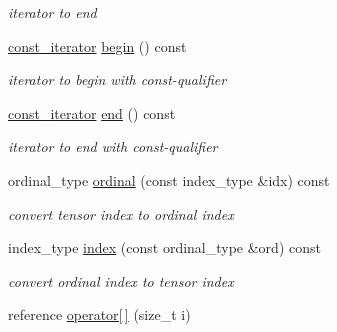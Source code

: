 \begin{DoxyCompactItemize}
\begin{DoxyCompactList}\small\item\em iterator to end \item\end{DoxyCompactList}\item 
\hypertarget{classbtas_1_1_tensor_view_a9e88e693271b40aef94f64db869b6d6e}{
\hyperlink{classbtas_1_1_tensor_iterator}{const\_\-iterator} \hyperlink{classbtas_1_1_tensor_view_a9e88e693271b40aef94f64db869b6d6e}{begin} () const }
\label{classbtas_1_1_tensor_view_a9e88e693271b40aef94f64db869b6d6e}

\begin{DoxyCompactList}\small\item\em iterator to begin with const-\/qualifier \item\end{DoxyCompactList}\item 
\hypertarget{classbtas_1_1_tensor_view_a58c3e09ba30b29b71818cdeef20d78c3}{
\hyperlink{classbtas_1_1_tensor_iterator}{const\_\-iterator} \hyperlink{classbtas_1_1_tensor_view_a58c3e09ba30b29b71818cdeef20d78c3}{end} () const }
\label{classbtas_1_1_tensor_view_a58c3e09ba30b29b71818cdeef20d78c3}

\begin{DoxyCompactList}\small\item\em iterator to end with const-\/qualifier \item\end{DoxyCompactList}\item 
\hypertarget{classbtas_1_1_tensor_view_ac3ceecb8cab4908b986105331eb2b21f}{
ordinal\_\-type \hyperlink{classbtas_1_1_tensor_view_ac3ceecb8cab4908b986105331eb2b21f}{ordinal} (const index\_\-type \&idx) const }
\label{classbtas_1_1_tensor_view_ac3ceecb8cab4908b986105331eb2b21f}

\begin{DoxyCompactList}\small\item\em convert tensor index to ordinal index \item\end{DoxyCompactList}\item 
\hypertarget{classbtas_1_1_tensor_view_acc795fe7b65fa592bea131ab5f6db1b0}{
index\_\-type \hyperlink{classbtas_1_1_tensor_view_acc795fe7b65fa592bea131ab5f6db1b0}{index} (const ordinal\_\-type \&ord) const }
\label{classbtas_1_1_tensor_view_acc795fe7b65fa592bea131ab5f6db1b0}

\begin{DoxyCompactList}\small\item\em convert ordinal index to tensor index \item\end{DoxyCompactList}\item 
\hypertarget{classbtas_1_1_tensor_view_ad0cd5b346cbe982c4adf84b853b7e1e9}{
reference \hyperlink{classbtas_1_1_tensor_view_ad0cd5b346cbe982c4adf84b853b7e1e9}{operator\mbox{[}$\,$\mbox{]}} (size\_\-t i)}
\label{classbtas_1_1_tensor_view_ad0cd5b346cbe982c4adf84b853b7e1e9}


\end{DoxyCompactItemize}
